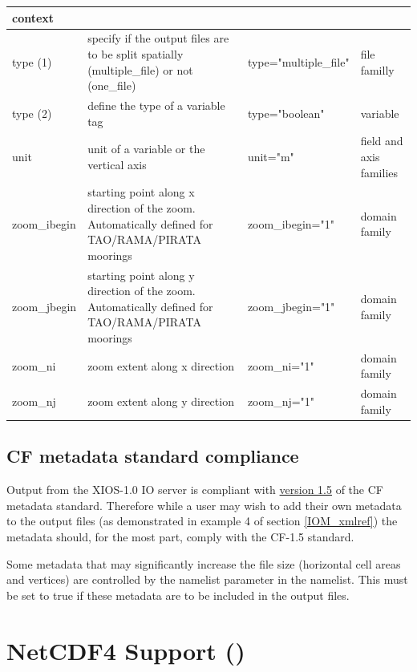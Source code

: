 \begin{longtable}{|p{2.2cm}|p{4cm}|p{3.8cm}|p{2cm}|}
   context \\ 
   \hline   
   type (1)& 
   specify if the output files are to be split spatially (multiple\_file) or not (one\_file) & 
   type="multiple\_file" & 
   file familly \\ 
   \hline   
   type (2)& 
   define the type of a variable tag & 
   type="boolean" & 
   variable \\ 
   \hline   
   unit & 
   unit of a variable or the vertical axis & 
   unit="m" & 
   field and axis families \\ 
   \hline   
   zoom\_ibegin & 
   starting point along x direction of the zoom. Automatically defined for TAO/RAMA/PIRATA moorings & 
   zoom\_ibegin="1" & 
   domain family \\ 
   \hline   
   zoom\_jbegin & 
   starting point along y direction of the zoom. Automatically defined for TAO/RAMA/PIRATA moorings & 
   zoom\_jbegin="1" & 
   domain family \\ 
   \hline   
   zoom\_ni & 
   zoom extent along x direction & 
   zoom\_ni="1" & 
   domain family \\ 
   \hline   
   zoom\_nj & 
   zoom extent along y direction & 
   zoom\_nj="1" & 
   domain family \\ 
   \hline   
\end{longtable}

\subsection{CF metadata standard compliance}

Output from the XIOS-1.0 IO server is compliant with \href{http://cfconventions.org/Data/cf-conventions/cf-conventions-1.5/build/cf-conventions.html}{version 1.5} of the CF metadata standard. Therefore while a user may wish to add their own metadata to the output files (as demonstrated in example 4 of section \ref{IOM_xmlref}) the metadata should, for the most part, comply with the CF-1.5 standard.

Some metadata that may significantly increase the file size (horizontal cell areas and vertices) are controlled by the namelist parameter  in the  namelist. This must be set to true if these metadata are to be included in the output files.


\section{NetCDF4 Support ()}
\label{DIA_iom}

